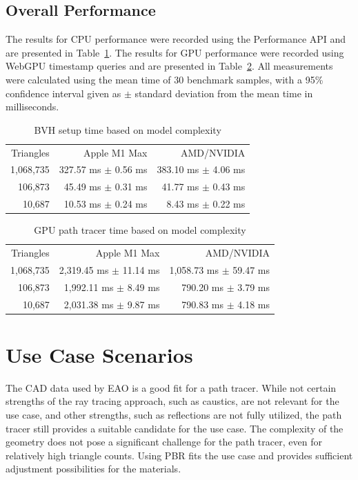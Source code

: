 \subsection{Overall Performance}

The results for CPU performance were recorded using the Performance API and are presented in Table~\ref{tab:cpuPerformance}. The results for GPU performance were recorded using \gls{WebGPU} timestamp queries and are presented in Table~\ref{tab:gpuPerformance}. All measurements were calculated using the mean time of 30 benchmark samples, with a 95\% confidence interval given as $\pm$ standard deviation from the mean time in milliseconds.


\begin{table}[H]
  \centering
  \begin{tabular}{rrr}
    \toprule
    Triangles   & Apple M1 Max    & AMD/NVIDIA \\
    1,068,735     & 327.57 ms $\pm$ 0.56 ms     & 383.10 ms $\pm$ 4.06 ms \\
    106,873     & 45.49 ms $\pm$ 0.31 ms    & 41.77 ms $\pm$ 0.43 ms \\
    10,687     & 10.53 ms $\pm$ 0.24 ms    & 8.43 ms $\pm$ 0.22 ms \\
    \bottomrule
  \end{tabular}
  \caption{BVH setup time based on model complexity}
  \label{tab:cpuPerformance}
\end{table}

\begin{table}[H]
  \centering
  \begin{tabular}{rrr}
    \toprule
    Triangles   & Apple M1 Max    & AMD/NVIDIA \\
    1,068,735     & 2,319.45 ms $\pm$ 11.14 ms    & 1,058.73 ms $\pm$ 59.47 ms \\
    106,873     & 1,992.11 ms $\pm$ 8.49 ms    & 790.20 ms $\pm$ 3.79 ms\\
    10,687     & 2,031.38 ms $\pm$ 9.87 ms    & 790.83 ms $\pm$ 4.18 ms \\
    \bottomrule
  \end{tabular}
  \caption{GPU path tracer time based on model complexity}
  \label{tab:gpuPerformance}
\end{table}
  

\section{Use Case Scenarios}

The \gls{CAD} data used by EAO is a good fit for a path tracer. While not certain strengths of the ray tracing approach, such as caustics, are not relevant for the use case, and other strengths, such as reflections are not fully utilized, the path tracer still provides a suitable candidate for the use case. The complexity of the geometry does not pose a significant challenge for the path tracer, even for relatively high triangle counts. Using \gls{PBR} fits the use case and provides sufficient adjustment possibilities for the materials.

